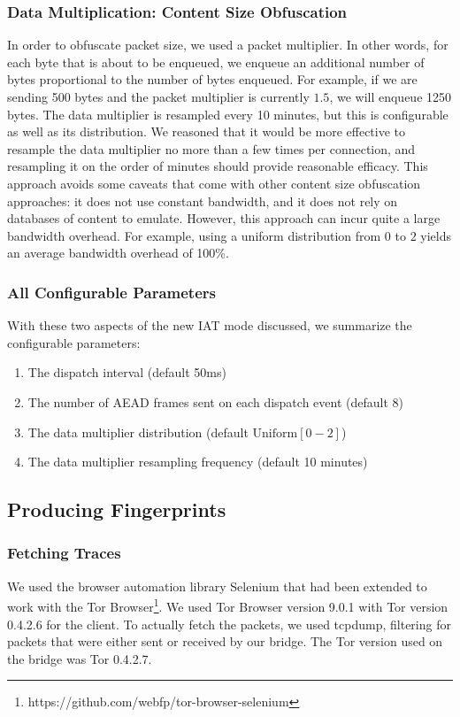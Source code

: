 \documentclass[11pt]{article}
\begin{document}
\subsubsection{Data Multiplication: Content Size Obfuscation}
In order to obfuscate packet size, we used a packet multiplier. In other words, for each byte that is about to be enqueued, we enqueue an additional number of bytes proportional to the number of bytes enqueued. For example, if we are sending 500 bytes and the packet multiplier is currently $1.5$, we will enqueue 1250 bytes. The data multiplier is resampled every 10 minutes, but this is configurable as well as its distribution. We reasoned that it would be more effective to resample the data multiplier no more than a few times per connection, and resampling it on the order of minutes should provide reasonable efficacy. This approach avoids some caveats that come with other content size obfuscation approaches: it does not use constant bandwidth, and it does not rely on databases of content to emulate. However, this approach can incur quite a large bandwidth overhead. For example, using a uniform distribution from $0$ to $2$ yields an average bandwidth overhead of 100\%.

\subsubsection{All Configurable Parameters}
With these two aspects of the new IAT mode discussed, we summarize the configurable parameters:
\begin{enumerate}
    \item The dispatch interval (default 50ms)
    \item The number of AEAD frames sent on each dispatch event (default 8)
    \item The data multiplier distribution (default $\text{Uniform}[0-2]$)
    \item The data multiplier resampling frequency (default 10 minutes)
\end{enumerate}

\subsection{Producing Fingerprints}
\subsubsection{Fetching Traces}
We used the browser automation library Selenium that had been extended to work with the Tor Browser\footnote{https://github.com/webfp/tor-browser-selenium}. We used Tor Browser version 9.0.1 with Tor version 0.4.2.6 for the client. To actually fetch the packets, we used tcpdump, filtering for packets that were either sent or received by our bridge. The Tor version used on the bridge was Tor 0.4.2.7.
\end{document}
